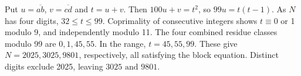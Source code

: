 Put $u=\overline{ab}$, $v=\overline{cd}$ and $t=u+v$. Then $100u+v=t^2$, so $99u=t(t-1)$. As $N$ has four digits, $32\le t\le99$. Coprimality of consecutive integers shows $t\equiv0$ or 1 modulo 9, and independently modulo 11. The four combined residue classes modulo 99 are $0,1,45,55$. In the range, $t=45,55,99$. These give $N=2025,3025,9801$, respectively, all satisfying the block equation. Distinct digits exclude 2025, leaving $\boxed{3025\text{ and }9801}$.
